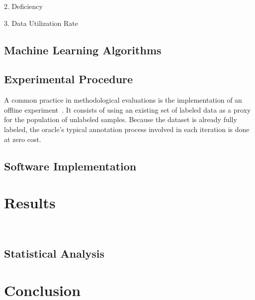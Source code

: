 \documentclass[parskip=full]{scrartcl}
\begin{document}
2. Deficiency

3. Data Utilization Rate

\subsection{Machine Learning Algorithms}

\subsection{Experimental Procedure}

A common practice in methodological evaluations is the implementation of an offline
experiment~\cite{Kagy2019}. It consists of using an existing set of labeled data as a proxy for the
population of unlabeled samples. Because the dataset is already fully labeled, the oracle's typical
annotation process involved in each iteration is done at zero cost.



\subsection{Software Implementation}

\section{Results}~\label{sec:results}

\subsection{Statistical Analysis}

\section{Conclusion}~\label{sec:conclusion}



\end{document}
